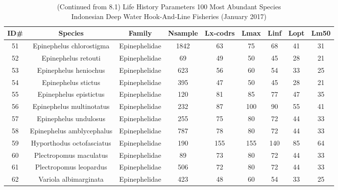\clearpage
\newpage%
{\small
\begin{longtable}{ccccccccc}
\caption{(Continued from 8.1) Life History Parameters 100 Most Abundant Species \\Indonesian Deep Water Hook-And-Line Fisheries (January 2017)} \\ 
  \hline
ID\# & Species & Family & Nsample & Lx-codrs & Lmax & Linf & Lopt & Lm50 \\ 
  \hline
51 & Epinephelus chlorostigma & Epinephelidae & 1842 & 63 & 75 & 68 & 41 & 31 \\ 
  52 & Epinephelus retouti & Epinephelidae & 69 & 49 & 50 & 45 & 28 & 21 \\ 
  53 & Epinephelus heniochus & Epinephelidae & 623 & 56 & 60 & 54 & 33 & 25 \\ 
  54 & Epinephelus stictus & Epinephelidae & 395 & 47 & 50 & 45 & 28 & 21 \\ 
  55 & Epinephelus epistictus & Epinephelidae & 120 & 81 & 85 & 77 & 47 & 35 \\ 
  56 & Epinephelus multinotatus & Epinephelidae & 232 & 87 & 100 & 90 & 55 & 41 \\ 
  57 & Epinephelus undulosus & Epinephelidae & 255 & 75 & 80 & 72 & 44 & 33 \\ 
  58 & Epinephelus amblycephalus & Epinephelidae & 787 & 78 & 80 & 72 & 44 & 33 \\ 
  59 & Hyporthodus octofasciatus & Epinephelidae & 190 & 155 & 155 & 140 & 85 & 64 \\ 
  60 & Plectropomus maculatus & Epinephelidae & 89 & 73 & 80 & 72 & 44 & 33 \\ 
  61 & Plectropomus leopardus & Epinephelidae & 506 & 72 & 80 & 72 & 44 & 33 \\ 
  62 & Variola albimarginata & Epinephelidae & 423 & 48 & 60 & 54 & 33 & 25 \\ 

\end{longtable}}
